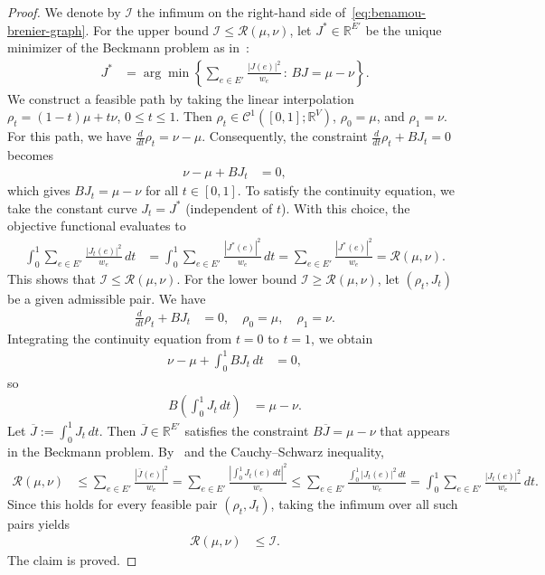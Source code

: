 \documentclass[11pt,a4paper]{article}
\newcommand{\Resis}{\mathcal{R}}
\begin{document}
\begin{proof}
    We denote by $\mathcal{I}$ the infimum on the right-hand side of~\cref{eq:benamou-brenier-graph}. For the upper bound $\mathcal{I} \le \Resis (\mu,\nu)$, let $J^\ast \in \mathbb{R}^{E'}$ be the unique minimizer of the Beckmann problem as in~:
        \begin{align*}
            J^\ast &= \arg\min \left\{ \sum_{e\in E'} \frac{|J(e)|^2}{w_e} \,:\, B J = \mu - \nu \right\}.
        \end{align*}
    We construct a feasible path by taking the linear interpolation $\rho_t = (1-t) \mu + t \nu $, $0\le t\le 1$. Then $\rho_t \in \mathcal{C}^1([0,1]; \mathbb{R}^{V})$, $\rho_0 = \mu$, and $\rho_1 = \nu$. For this path, we have $\frac{d}{dt}\rho_t = \nu - \mu$. Consequently, the constraint $\frac{d}{dt}\rho_t + BJ_t = 0$ becomes
        \begin{align*}
            \nu - \mu + B J_t &= 0,
        \end{align*}
    which gives $B J_t = \mu - \nu$ for all $t \in [0, 1]$. To satisfy the continuity equation, we take the constant curve $J_t = J^*$ (independent of $t$). With this choice, the objective functional evaluates to
        \begin{align*}
            \int_0^1 \sum_{e\in E'} \frac{|J_t(e)|^2}{w_e} \, dt &= \int_0^1 \sum_{e\in E'} \frac{|J^\ast(e)|^2}{w_e} \, dt = \sum_{e\in E'} \frac{|J^\ast(e)|^2}{w_e} = \Resis(\mu,\nu).
        \end{align*}
    This shows that $\mathcal{I} \le \Resis(\mu,\nu)$. For the lower bound $\mathcal{I} \ge \Resis(\mu,\nu)$, let $(\rho_t, J_t)$ be a given admissible pair. We have
        \begin{align*}
            \frac{d}{dt} \rho_t + B J_t &= 0, \quad \rho_0 = \mu, \quad \rho_1 = \nu.
        \end{align*}
    Integrating the continuity equation from $t=0$ to $t=1$, we obtain
        \begin{align*}
            \nu - \mu + \int_0^1 B J_t \, dt &= 0,
        \end{align*}
    so
        \begin{align*}
            B \left( \int_0^1 J_t \, dt \right) &= \mu - \nu.
        \end{align*}
    Let $\overline{J} := \int_0^1 J_t \, dt$. Then $\overline{J} \in \mathbb{R}^{E'}$ satisfies the constraint $B\overline{J} = \mu - \nu$ that appears in the Beckmann problem. By~ and the Cauchy--Schwarz inequality,
        \begin{align*}
            \Resis(\mu,\nu) &\le \sum_{e\in E'} \frac{|\overline{J}(e)|^2}{w_e} = \sum_{e\in E'} \frac{\left| \int_0^1 J_t(e) \, dt \right|^2}{w_e} \le \sum_{e\in E'} \frac{ \int_0^1 |J_t(e)|^2 \, dt}{w_e} = \int_0^1 \sum_{e\in E'} \frac{|J_t(e)|^2}{w_e} \, dt.
        \end{align*}
    Since this holds for every feasible pair $(\rho_t, J_t)$, taking the infimum over all such pairs yields
        \begin{align*}
            \Resis(\mu,\nu) &\le \mathcal{I}.
        \end{align*}
    The claim is proved.
\end{proof}
\end{document}
